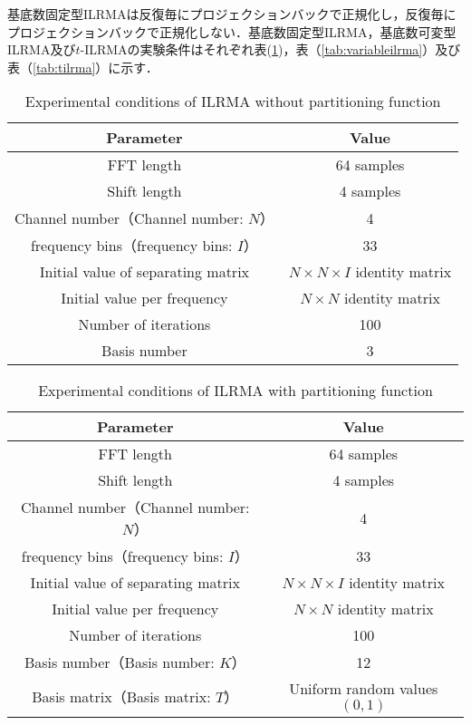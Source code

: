 {基底数固定型ILRMAは反復毎にプロジェクションバックで正規化し，反復毎にプロジェクションバックで正規化しない．基底数固定型ILRMA，基底数可変型ILRMA及び$t$-ILRMAの実験条件はそれぞれ表(\ref{tab:fixedilrma})，表（\ref{tab:variableilrma}）及び表（\ref{tab:tilrma}）に示す．
\begin{table}[t]
  \caption{Experimental conditions of ILRMA without partitioning function}
  \centering
  \begin{tabular}{cc} \hline
    Parameter & Value \\ \hline \hline
    FFT length & 64 samples  \\ \hline
    Shift length & 4 samples \\ \hline
    Channel number（Channel number: $N$） & 4 \\ \hline
    frequency bins（frequency bins: $I$） & 33 \\ \hline
    Initial value of separating matrix & $N \times N \times I$ identity matrix  \\ \hline
    Initial value per frequency & $N \times N$ identity matrix  \\ \hline
    Number of iterations & 100\\ \hline
    Basis number & 3 \\ \hline \hline
  \end{tabular}
  \label{tab:fixedilrma}
\end{table}
\begin{table}[t]
  \caption{Experimental conditions of ILRMA with partitioning function}
  \centering
  \begin{tabular}{cc} \hline
    Parameter & Value \\ \hline \hline
    FFT length & 64 samples  \\ \hline
    Shift length & 4 samples \\ \hline
    Channel number（Channel number: $N$） & 4 \\ \hline
    frequency bins（frequency bins: $I$） & 33 \\ \hline 
    Initial value of separating matrix & $N \times N \times I$ identity matrix  \\ \hline
    Initial value per frequency & $N \times N$ identity matrix  \\ \hline
    Number of iterations & 100\\ \hline
    Basis number（Basis number: $K$） & 12 \\ \hline
    Basis matrix（Basis matrix: $T$） & Uniform random values $(0,1)$ \\ \hline

\end{tabular}
\end{table}}
